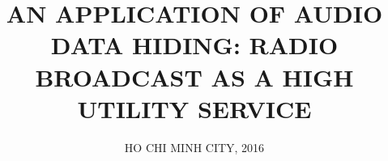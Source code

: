 \documentclass[a4paper, 13pt, oneside]{Thesis}  %
\begin{document}
\frontmatter      %

\title  {AN APPLICATION OF AUDIO DATA HIDING: RADIO BROADCAST AS
A HIGH UTILITY SERVICE}
\addresses  {\groupname\\\deptname\\\univname}  %
\date       {HO CHI MINH CITY, 2016}
\subject    {}
\keywords   {}

\maketitle


\fancyhead{}  %
\rhead{\thepage}  %
\lhead{}  %

\pagestyle{fancy}  %


\end{document}
